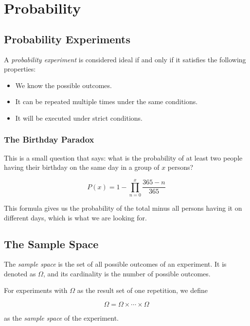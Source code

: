 \chapter{Probability}

\section{Probability Experiments}

A \emph{probability experiment} is considered ideal if and only if it satisfies the following properties:

\begin{itemize}
   
    \item We know the possible outcomes. 

    \item It can be repeated multiple times under the same conditions.

    \item It will be executed under strict conditions.

\end{itemize}

\subsection{The Birthday Paradox}

This is a small question that says: what is the probability of at least two people having 
their birthday on the same day in a group of \(x\) persons?

\[
    P(x) = 1 - \prod_{n = 0}^{x} \frac{365 - n}{365}
\]

This formula gives us the probability of the total minus all persons having it on different days, which is 
what we are looking for.

\section{The Sample Space}

The \emph{sample space} is the set of all possible outcomes of an experiment. It is denoted as \(\Omega\), and its cardinality 
is the number of possible outcomes.

For experiments with \(\Omega\) as the result set of one repetition, we define 

\[
    \Omega = \Omega \times \cdots \times \Omega  
\]

as the \emph{sample space} of the experiment.

